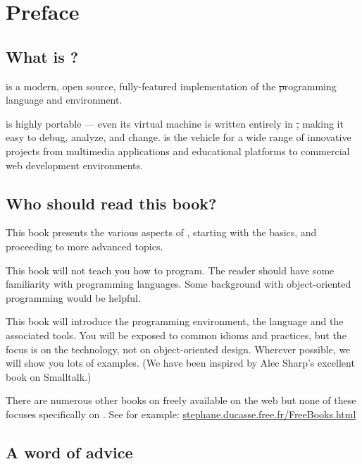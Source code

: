 \documentclass[a4paper,10pt,twoside]{book}
\begin{document}
	\renewcommand{\nnbb}[2]{} %
	\sloppy
	\frontmatter
\fi
\chapter{Preface}\label{cha:intro}

\section*{What is \sq?}

\sq is a modern, open source, fully-featured implementation of the \st programming language and environment.

\sq is highly portable --- even its virtual machine is written entirely in \st, making it easy to debug, analyze, and change. \sq is the vehicle for a wide range of innovative projects from multimedia applications and educational platforms to commercial web development environments. 

\section*{Who should read this book?}

This book presents the various aspects of \sq, starting with the basics, and proceeding to more advanced topics.

This book will not teach you how to program. The reader should have some familiarity with programming languages. Some background with object-oriented programming would be helpful.

This book will introduce the \sq programming environment, the language and the associated tools.  You will be exposed to common idioms and practices, but the focus is on the technology, not on object-oriented design. Wherever possible, we will show you lots of examples. (We have been inspired by Alec Sharp's excellent book on Smalltalk\cite{Shar97a}.)

There are numerous other books on \st freely available on the web but none of these focuses specifically on \sq. See for example:
\url{stephane.ducasse.free.fr/FreeBooks.html}

\ifluluelse{}{\newpage} %
\section*{A word of advice}
\end{document}
